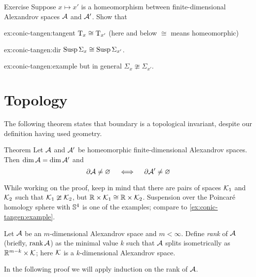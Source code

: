 \begin{thm}{Exercise}\label{ex:conic-tangent}
Suppose $x\mapsto x'$ is a homeomorphism between finite-dimensional Alexandrov spaces $\mathcal{A}$ and $\mathcal{A}'$. Show that 

\begin{subthm}{ex:conic-tangen:tangent}
$\mathrm{T}_x\cong \mathrm{T}_{x'}$ (here and below $\cong $ means homeomorphic) 
\end{subthm}

\begin{subthm}{ex:conic-tangen:dir}
$\mathop{\rm Susp}\nolimits\Sigma_x\cong \mathop{\rm Susp}\nolimits\Sigma_{x'}$.
\end{subthm}

\begin{subthm}{ex:conic-tangen:example}
but in general $\Sigma_x\ncong\Sigma_{x'}$.
\end{subthm}

\end{thm}



\section{Topology}

The following theorem states that boundary is a topological invariant, despite our definition having used geometry.

\begin{thm}{Theorem}\label{thm:top-bry}
Let $\mathcal{A}$ and $\mathcal{A}'$ be homeomorphic finite-dimensional Alexandrov spaces.
Then $\operatorname{\rm dim}\nolimits \mathcal{A}=\operatorname{\rm dim}\nolimits\mathcal{A}'$ and
\[\partial\mathcal{A}\ne \varnothing
\quad\iff\quad
\partial\mathcal{A}'\ne \varnothing
\]
\end{thm}

While working on the proof, keep in mind that there are pairs of spaces $\mathcal{K}_1$ and $\mathcal{K}_2$ such that $\mathcal{K}_1\ncong \mathcal{K}_2$, but $\mathbb{R}\times \mathcal{K}_1\cong \mathbb{R}\times \mathcal{K}_2$.
Suspension over the Poincaré homology sphere with $\mathbb{S}^4$ is one of the examples; compare to \ref{ex:conic-tangen:example}.

Let $\mathcal{A}$ be an $m$-dimensional Alexandrov space and $m<\infty$.
Define \emph{rank} of $\mathcal{A}$ (briefly, $\operatorname{\rm rank}\nolimits\mathcal{A}$) as the minimal value $k$ such that $\mathcal{A}$ splits isometrically as $\mathbb{R}^{m-k}\times \mathcal{K}$;
here $\mathcal{K}$ is a $k$-dimensional Alexandrov space.

In the following proof we will apply induction on the rank of $\mathcal{A}$.


